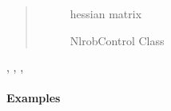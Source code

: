 \documentclass[letterpaper,10pt,english]{sphinxmanual}
\begin{document}
\begin{fulllineitems}
\begin{quote}
\begin{description}
\begin{description}
\item[{}] \leavevmode
hessian matrix

\item[{}] \leavevmode
NlrobControl Class

\end{description}

\end{description}\end{quote}




{\hyperref[\detokenize{_modules/nlrob:module-nlrob}]{}}, {\hyperref[\detokenize{_modules/nlrob:nlrob.nlrob_MM}]{}}, {\hyperref[\detokenize{_modules/nlrob:nlrob.nlrob_tau}]{}}, {\hyperref[\detokenize{_modules/nlrob:nlrob.nlrob_mtl}]{}}


\paragraph{Examples}


\end{fulllineitems}
\end{document}
